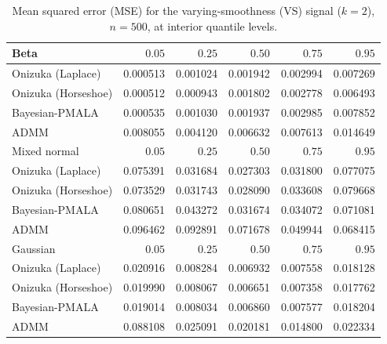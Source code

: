 \begin{table}[!htbp]
\centering
\small
\caption{Mean squared error (MSE) for the varying-smoothness (VS) signal ($k=2$), $n=500$, at interior quantile levels.}
\label{tab:vs_int_mse}
\begin{tabular}{lrrrrr}
\toprule
Beta & $0.05$ & $0.25$ & $0.50$ & $0.75$ & $0.95$ \\
\midrule
Onizuka (Laplace) & 0.000513 & 0.001024 & 0.001942 & 0.002994 & 0.007269 \\
Onizuka (Horseshoe) & 0.000512 & 0.000943 & 0.001802 & 0.002778 & 0.006493 \\
Bayesian-PMALA & 0.000535 & 0.001030 & 0.001937 & 0.002985 & 0.007852 \\
ADMM & 0.008055 & 0.004120 & 0.006632 & 0.007613 & 0.014649 \\
\midrule
Mixed normal & $0.05$ & $0.25$ & $0.50$ & $0.75$ & $0.95$ \\
\midrule
Onizuka (Laplace) & 0.075391 & 0.031684 & 0.027303 & 0.031800 & 0.077075 \\
Onizuka (Horseshoe) & 0.073529 & 0.031743 & 0.028090 & 0.033608 & 0.079668 \\
Bayesian-PMALA & 0.080651 & 0.043272 & 0.031674 & 0.034072 & 0.071081 \\
ADMM & 0.096462 & 0.092891 & 0.071678 & 0.049944 & 0.068415 \\
\midrule
Gaussian & $0.05$ & $0.25$ & $0.50$ & $0.75$ & $0.95$ \\
\midrule
Onizuka (Laplace) & 0.020916 & 0.008284 & 0.006932 & 0.007558 & 0.018128 \\
Onizuka (Horseshoe) & 0.019990 & 0.008067 & 0.006651 & 0.007358 & 0.017762 \\
Bayesian-PMALA & 0.019014 & 0.008034 & 0.006860 & 0.007577 & 0.018204 \\
ADMM & 0.088108 & 0.025091 & 0.020181 & 0.014800 & 0.022334 \\
\bottomrule
\end{tabular}
\end{table}
